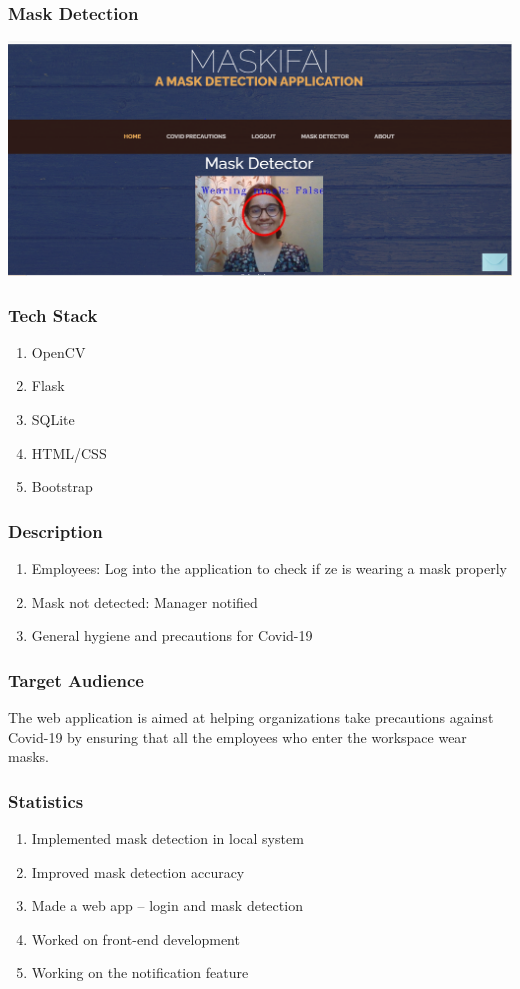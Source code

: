 \documentclass[14pt]{beamer}
\begin{document}
\begin{frame}
    \frametitle{Mask Detection}
    \includegraphics[scale=0.3]{no_mask}
\end{frame}

\begin{frame}
    \frametitle{Tech Stack}
    \begin{enumerate}
        \item OpenCV
        \item Flask
        \item SQLite
        \item HTML/CSS
        \item Bootstrap
    \end{enumerate}
\end{frame} 

\begin{frame}
    \frametitle{Description}
    \begin{enumerate}

        \item Employees: Log into the application to check if ze is wearing a mask properly

        \item Mask not detected: Manager notified

        \item General hygiene and precautions for Covid-19
    \end{enumerate}
\end{frame}


\begin{frame}
    \frametitle{Target Audience}
    The web application is aimed at helping organizations take precautions against Covid-19 by ensuring that all the employees who enter the workspace wear masks.
\end{frame}

\begin{frame}
    \frametitle{Statistics}
    \begin{enumerate}
        \item Implemented mask detection in local system
        \item Improved mask detection accuracy
        \item Made a web app -- login and mask detection
        \item Worked on front-end development
        \item Working on the notification feature
    \end{enumerate}
\end{frame}
\end{document}
